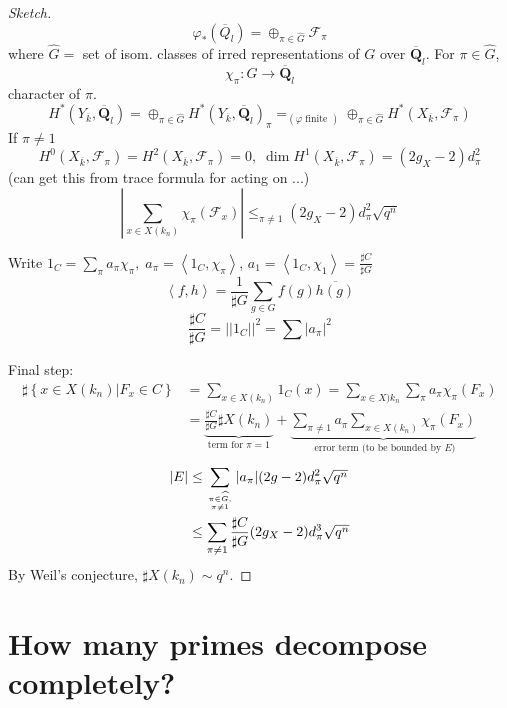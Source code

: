\begin{proof}[Sketch]
	$$\varphi_*(\overline Q_l) = \oplus_{\pi\in \widehat G} 
\mathcal{F}_{\pi}$$
	where $\widehat G = $ set of isom. classes of irred representations of 
$G$ over $\overline{\mathbf{Q}}_l$. For $\pi\in \widehat G$, 
		$$\chi_{\pi}: G\to\overline{\mathbf{Q}}_l$$
		character of $\pi$. 
	$$H^*(Y_{\overline k}, \overline{\mathbf{Q}}_l) = \oplus_{\pi\in 
\widehat G} H^*(Y_{\overline k}, \overline{\mathbf{Q}}_l)_\pi =_{(\varphi\text{ 
finite })} \oplus_{\pi\in \widehat G}H^*(X_{\overline k}, \mathcal{F}_\pi)$$
	If $\pi\neq 1$
	$$H^0(X_{\overline k},\mathcal{F}_\pi) = H^2(X_{\overline k}, 
\mathcal{F}_\pi)=0, \; \dim H^1(X_{\overline k}, \mathcal{F}_\pi) = 
(2g_X-2)d_\pi^2$$
	(can get this from trace formula for acting on ...)
	$$\left|\sum_{x\in X(k_n)}\chi_\pi(\mathcal{F}_x)\right|\leq_{\pi\neq 
1} (2g_X-2)d_\pi^2\sqrt{q^n}$$
	
	Write $1_C = \sum_\pi a_\pi\chi_\pi, \; a_\pi=\left<1_C, 
\chi_\pi\right>$, $a_1 = \left<1_C, \chi_1\right> = \frac{\sharp C}{\sharp G}$
	$$\left<f, h\right> = \frac{1}{\sharp G}\sum_{g\in 
G}f(g)\overline{h(g)}$$
	$$\frac{\sharp C}{\sharp G} = ||1_C||^2 = \sum|a_\pi|^2$$

\noindent
Final step: 
	\begin{align*}
	\sharp\left\{x\in X(k_n)\left| F_x\in C\right.\right\}&=\sum_{x\in 
X(k_n)}1_C(x) = \sum_{x\in X)k_n}\sum_{\pi}a_\pi\chi_\pi(F_x)\\
	&=\underbrace{\frac{\sharp C}{\sharp G}\sharp X(k_n)}_{\text{term for 
}\pi=1}+\underbrace{\sum_{\pi\neq 1}a_\pi\sum_{x\in 
X(k_n)}\chi_\pi(F_x)}_{\text{ error term (to be bounded by $E$)}}
	\end{align*}
	\begin{align*}
	|E|&\leq \sum_{\pi\in \widehat G, \atop \pi\neq 
1}|a_\pi|(2g-2)d_\pi^2\sqrt{q^n}\\
	&\leq \sum_{\pi\neq 1} \frac{\sharp C}{\sharp G} 
(2g_X-2)d_\pi^3\sqrt{q^n}
	\end{align*}
By Weil's conjecture, $\sharp X(k_n)\sim q^n$. 
\end{proof}



\section{How many primes decompose completely?}
\label{section-how-many}

